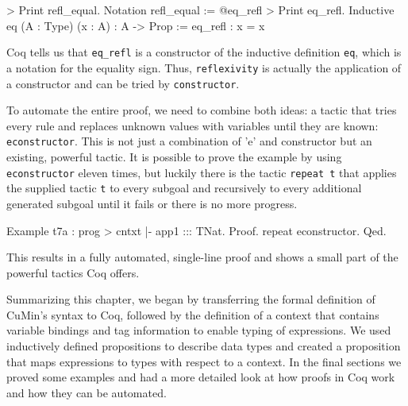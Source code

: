 \documentclass[paper = a4, fleqn, twoside]{scrreprt}
\newcommand{\coqinline}[1]{\texttt{#1}}
\begin{document}
\begin{coqcode}
> Print refl_equal.
Notation refl_equal := @eq_refl
> Print eq_refl.
Inductive eq (A : Type) (x : A) : A -> Prop :=  eq_refl : x = x
\end{coqcode}
Coq tells us that \texttt{eq\_refl} is a constructor of the inductive definition \texttt{eq}, which is a notation for the equality sign. Thus, \texttt{reflexivity} is actually the application of a constructor and can be tried by \texttt{constructor}.\\ 
\par \noindent
To automate the entire proof, we need to combine both ideas: a tactic that tries every rule and replaces unknown values with variables until they are known: \coqinline{econstructor}. This is not just a combination of 'e' and constructor but an existing, powerful tactic. It is possible to prove the example by using \coqinline{econstructor} eleven times, but luckily there is the tactic \coqinline{repeat t} that applies the supplied tactic \coqinline{t} to every subgoal and recursively to every additional generated subgoal until it fails or there is no more progress.
\begin{coqcode}
Example t7a : prog > cntxt |- app1 ::: TNat.
Proof.
  repeat econstructor.
Qed.
\end{coqcode}
This results in a fully automated, single-line proof and shows a small part of the powerful tactics Coq offers.\\
\par \noindent
Summarizing this chapter, we began by transferring the formal definition of CuMin's syntax to Coq, followed by the definition of a context that contains variable bindings and tag information to enable typing of expressions. We used inductively defined propositions to describe data types and created a proposition that maps expressions to types with respect to a context. In the final sections we proved some examples and had a more detailed look at how proofs in Coq work and how they can be automated.
\end{document}
